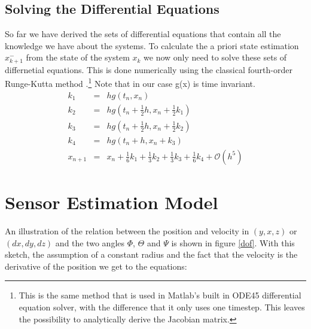 \subsection*{Solving the Differential Equations}
So far we have derived the sets of differential equations that contain all the knowledge we have about the systems. To calculate the a priori state estimation $x^{-}_{k+1}$ from the state of the system $x_{k}$ we now only need to solve these sets of differnetial equations. This is done numerically using the classical fourth-order Runge-Kutta method \cite{Kutta1901}.\footnote{This is the same method that is used in Matlab's built in ODE45 differential equation solver, with the difference that it only uses one timestep. This leaves the possibility to analytically derive the Jacobian matrix.} Note that in our case g(x) is time invariant. 
\begin{eqnarray}k_{1}&=&h g(t_{n},x_{n})\\
k_{2}&=&h g(t_{n}+\frac{1}{2}h,x_{n}+\frac{1}{2}k_{1})\\
k_{3}&=&h g(t_{n}+\frac{1}{2}h,x_{n}+\frac{1}{2}k_{2})\\
k_{4}&=&h g(t_{n}+h,x_{n}+k_{3})\\
x_{n+1}&=&x_{n} + \frac{1}{6} k_{1} + \frac{1}{3} k_{2} + \frac{1}{3} k_{3} + \frac{1}{6} k_{4} + \mathcal{O}(h^{5})\end{eqnarray}

\section{Sensor Estimation Model}\label{sensor_estimation}
An illustration of the relation between the position and velocity in $(y,x,z)$ or $(dx,dy,dz)$ and the two angles $\Phi$, $\Theta$ and $\Psi$  is shown in figure \ref{dof}. With this sketch, the assumption of a constant radius and the fact that the velocity is the derivative of the position we get to the equations: 

